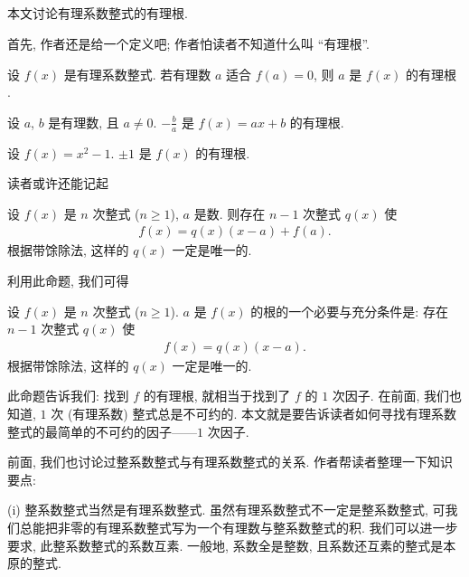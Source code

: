 \subsection*{\RationalRootsOfPolynomialsOverQ}
\markright{\RationalRootsOfPolynomialsOverQ}

本文讨论有理系数整式的有理根.

首先, 作者还是给一个定义吧; 作者怕读者不知道什么叫 ``有理根''.

\begin{definition}
    设 $f(x)$ 是有理系数整式. 若有理数 $a$ 适合 $f(a) = 0$, 则 $a$ 是 $f(x)$ 的有理根 .
\end{definition}

\begin{example}
    设 $a$, $b$ 是有理数, 且 $a \neq 0$. $-\frac{b}{a}$ 是 $f(x) = ax + b$ 的有理根.
\end{example}

\begin{example}
    设 $f(x) = x^2 - 1$. $\pm 1$ 是 $f(x)$ 的有理根.
\end{example}

读者或许还能记起
\begin{proposition}
    设 $f(x)$ 是 $n$ 次整式 ($n \geq 1$), $a$ 是数. 则存在 $n-1$ 次整式 $q(x)$ 使
    \begin{align*}
        f(x) = q(x) (x-a) + f(a).
    \end{align*}
    根据带馀除法, 这样的 $q(x)$ 一定是唯一的.
\end{proposition}

利用此命题, 我们可得
\begin{proposition}
    设 $f(x)$ 是 $n$ 次整式 ($n \geq 1$). $a$ 是 $f(x)$ 的根的一个必要与充分条件是: 存在 $n-1$ 次整式 $q(x)$ 使
    \begin{align*}
        f(x) = q(x) (x-a).
    \end{align*}
    根据带馀除法, 这样的 $q(x)$ 一定是唯一的.
\end{proposition}

此命题告诉我们: 找到 $f$ 的有理根, 就相当于找到了 $f$ 的 $1$ 次因子. 在前面, 我们也知道, $1$ 次 (有理系数) 整式总是不可约的. 本文就是要告诉读者如何寻找有理系数整式的最简单的不可约的因子——$1$ 次因子.

前面, 我们也讨论过整系数整式与有理系数整式的关系. 作者帮读者整理一下知识要点:

(i) 整系数整式当然是有理系数整式. 虽然有理系数整式不一定是整系数整式, 可我们总能把非零的有理系数整式写为一个有理数与整系数整式的积. 我们可以进一步要求, 此整系数整式的系数互素. 一般地, 系数全是整数, 且系数还互素的整式是本原的整式.


